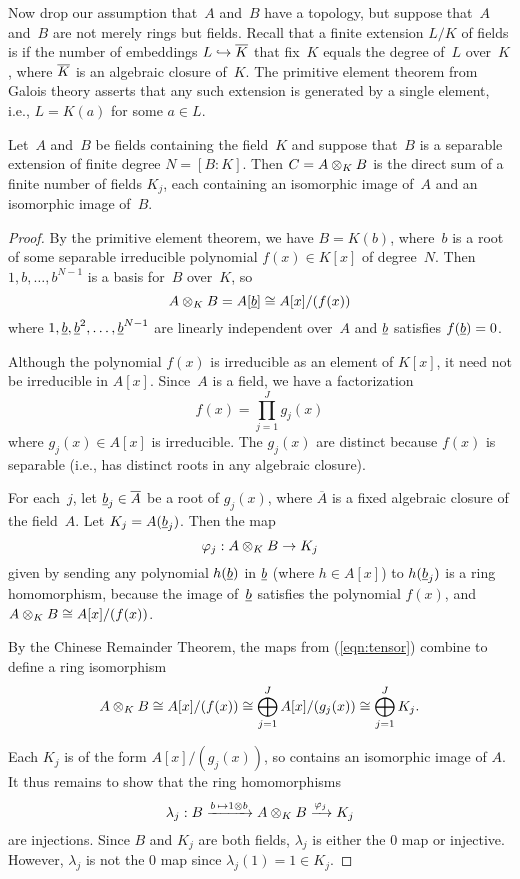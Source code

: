 Now drop our assumption that~$A$ and~$B$ have a topology, but suppose
that~$A$ and~$B$ are not merely rings but fields.  Recall that a
finite extension $L/K$ of fields is  if the number of
embeddings $L\hookrightarrow \overline{K}$ that fix~$K$ equals the degree of~$L$
over~$K$, where $\overline{K}$ is an algebraic closure of~$K$.  The primitive
element theorem from Galois theory asserts that any such extension is
generated by a single element, i.e., $L=K(a)$ for some $a\in L$.
\begin{lemma}\label{lem:tensor_prod}
  Let~$A$ and~$B$ be fields containing the field~$K$ and suppose
  that~$B$ is a separable extension of finite degree $N=[B:K]$.  Then
  $C=A\otimes_K B$ is the direct sum of a finite number of fields
  $K_j$, each containing an isomorphic image of~$A$ and an isomorphic
  image of~$B$.
\end{lemma}
\begin{proof}
  By the primitive element theorem, we have $B=K(b)$, where~$b$ is a
  root of some separable irreducible polynomial $f(x)\in K[x]$ of
  degree~$N$.  Then $1,b,\ldots, b^{N-1}$ is a basis 
for~$B$ over~$K$, so
$$
  A\otimes_K B = A[\underline{b}] \cong A[x]/(f(x))
$$
where $1,\underline{b},\underline{b}^2,\ldots,\underline{b}^{N-1}$ are 
linearly independent over~$A$ and $\underline{b}$ satisfies 
$f(\underline{b})=0$.

Although the polynomial $f(x)$ is irreducible as an element
of $K[x]$, it need not be irreducible in $A[x]$.  Since~$A$
is a field,  we have a factorization 
$$
   f(x) = \prod_{j=1}^J g_j(x)
$$
where $g_j(x)\in A[x]$ is irreducible.  The $g_j(x)$ are
distinct because $f(x)$ is separable (i.e., has distinct
roots in any algebraic closure).   

For each~$j$, let $\underline{b}_j\in \overline{A}$ be a root of $g_j(x)$, where
$\overline{A}$ is a fixed 
algebraic closure of the field~$A$.  Let $K_j = A(\underline{b}_j)$.
Then the map
\begin{equation}\label{eqn:tensor}
  \varphi_j : A\otimes_K B \to K_j
\end{equation}
given by sending any polynomial $h(\underline{b})$ in $\underline{b}$ (where $h\in A[x]$)
to $h(\underline{b}_j)$ is a ring homomorphism, because the image
of~$\underline{b}$ satisfies the polynomial $f(x)$, and $A\otimes_K B\cong A[x]/(f(x))$.

By the Chinese Remainder Theorem, the maps from (\ref{eqn:tensor})
combine to define a ring isomorphism
$$
 A\otimes_K B \cong A[x]/(f(x)) \cong \bigoplus_{j=1}^J A[x]/(g_j(x))
   \cong \bigoplus_{j=1}^J K_j.
$$

Each $K_j$ is of the form $A[x]/(g_j(x))$, so contains an isomorphic
image of $A$.  It thus remains to show that the ring 
homomorphisms
$$
  \lambda_j : B \xrightarrow{b\,\mapsto 1\otimes b} A\otimes_K B \xrightarrow{\varphi_j} K_j
$$
are injections.  Since $B$ and $K_j$ are both fields, $\lambda_j$
is either the $0$ map or injective.  However, $\lambda_j$ is
not the $0$ map since $\lambda_j(1)=1\in K_j$.  
\end{proof}
